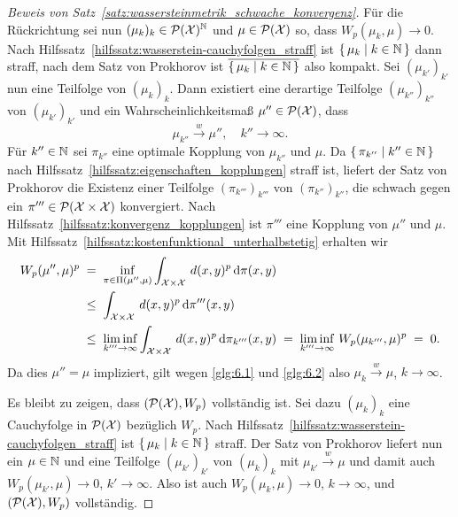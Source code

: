 \documentclass[../thesis/thesis.tex]{subfiles}
\begin{document}
\begin{proof}[Beweis von Satz~\ref{satz:wassersteinmetrik_schwache_konvergenz}]
		Für die Rückrichtung sei nun $(\mu_k)_k \in \mathcal{P}(\mathcal{X})^{\mathbb{N}}$ und $\mu \in \mathcal{P}(\mathcal{X})$ so, dass $W_p(\mu_k, \mu) \to 0$. Nach Hilfssatz~\ref{hilfssatz:wasserstein-cauchyfolgen_straff} ist $\left\{\, \mu_k \; \middle| \; k \in \mathbb{N} \,\right\}$ dann straff, nach dem Satz von Prokhorov ist $\overline{\left\{\, \mu_k \; \middle| \; k \in \mathbb{N} \,\right\}}$ also kompakt. Sei $(\mu_{k'})_{k'}$ nun eine Teilfolge von $(\mu_k)_k$. Dann existiert eine derartige Teilfolge $(\mu_{k''})_{k''}$ von $(\mu_{k'})_{k'}$ und ein Wahrscheinlichkeitsmaß $\mu'' \in \mathcal{P}(\mathcal{X})$, dass
		\[ \mu_{k''} \xrightarrow{w} \mu'', \quad k'' \to \infty \text{.} \label{glg:6.2} \tag{6.2} \]
		Für $k'' \in \mathbb{N}$ sei $\pi_{k''}$ eine optimale Kopplung von $\mu_{k''}$ und $\mu$. Da $\left\{\, \pi_{k''} \; \middle| \; k'' \in \mathbb{N} \,\right\}$ nach Hilfssatz~\ref{hilfssatz:eigenschaften_kopplungen} straff ist, liefert der Satz von Prokhorov die Existenz einer Teilfolge $(\pi_{k'''})_{k'''}$ von $(\pi_{k''})_{k''}$, die schwach gegen ein $\pi''' \in \mathcal{P}(\mathcal{X} \times \mathcal{X})$ konvergiert. Nach Hilfssatz~\ref{hilfssatz:konvergenz_kopplungen} ist $\pi'''$ eine Kopplung von $\mu''$ und $\mu$. Mit Hilfssatz~\ref{hilfssatz:kostenfunktional_unterhalbstetig} erhalten wir
		\begin{align*}
			W_p(\mu'', \mu)^p \; &= \; \inf_{\pi \in \Pi(\mu'', \mu)} \int_{\mathcal{X} \times \mathcal{X}} \, d(x, y)^p \, \mathrm{d}\pi(x, y) \\
			                \; &\leq \; \int_{\mathcal{X} \times \mathcal{X}} \, d(x, y)^p \, \mathrm{d}\pi'''(x, y) \\
			                \; &\leq \; \liminf_{k''' \to \infty} \int_{\mathcal{X} \times \mathcal{X}} \, d(x, y)^p \, \mathrm{d}\pi_{k'''}(x, y) \; = \; \liminf_{k''' \to \infty} \, W_p( \mu_{k'''}, \mu)^p \; = \; 0 \text{.}
		\end{align*}
		Da dies $\mu'' = \mu$ impliziert, gilt wegen \eqref{glg:6.1} und \eqref{glg:6.2} also
		$\mu_k \xrightarrow{w} \mu$, $k \to \infty$.
		
		Es bleibt zu zeigen, dass $(\mathcal{P}(\mathcal{X}), W_p)$ vollständig ist. Sei dazu $(\mu_k)_k$ eine Cauchyfolge in $\mathcal{P}(\mathcal{X})$ bezüglich $W_p$. Nach Hilfssatz~\ref{hilfssatz:wasserstein-cauchyfolgen_straff} ist 
		$\left\{\, \mu_k \; \middle| \; k \in \mathbb{N} \,\right\}$ straff. Der Satz von Prokhorov liefert nun ein $\mu \in \mathbb{N}$ und eine Teilfolge $(\mu_{k'})_{k'}$ von $(\mu_k)_k$ mit $\mu_{k'} \xrightarrow{w} \mu$ und damit auch
		$W_p(\mu_{k'}, \mu) \to 0$, $k' \to \infty$. Also ist auch $W_p(\mu_k, \mu) \to 0$, $k \to \infty$, und $(\mathcal{P}(\mathcal{X}), W_p)$ vollständig.
	\end{proof}
	
\end{document}
